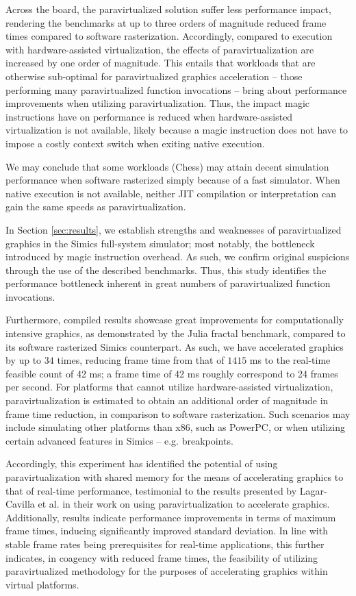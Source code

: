 \documentclass{article}
\begin{document}
Across the board, the paravirtualized solution suffer less performance impact, rendering the benchmarks at up to three orders of magnitude reduced frame times compared to software rasterization.
Accordingly, compared to execution with hardware-assisted virtualization, the effects of paravirtualization are increased by one order of magnitude.
This entails that workloads that are otherwise sub-optimal for paravirtualized graphics acceleration -- those performing many paravirtualized function invocations -- bring about performance improvements when utilizing paravirtualization.
Thus, the impact magic instructions have on performance is reduced when hardware-assisted virtualization is not available, likely because a magic instruction does not have to impose a costly context switch when exiting native execution.

We may conclude that some workloads (Chess) may attain decent simulation performance when software rasterized simply because of a fast simulator.
When native execution is not available, neither JIT compilation or interpretation can gain the same speeds as paravirtualization.

In Section \ref{sec:results}, we establish strengths and weaknesses of paravirtualized graphics in the Simics full-system simulator; most notably, the bottleneck introduced by magic instruction overhead.
As such, we confirm original suspicions through the use of the described benchmarks.
Thus, this study identifies the performance bottleneck inherent in great numbers of paravirtualized function invocations.

Furthermore, compiled results showcase great improvements for computationally intensive graphics, as demonstrated by the Julia fractal benchmark, compared to its software rasterized Simics counterpart.
As such, we have accelerated graphics by up to $34$ times, reducing frame time from that of $1415$ ms to the real-time feasible count of 42 ms; a frame time of 42 ms roughly correspond to 24 frames per second.
For platforms that cannot utilize hardware-assisted virtualization, paravirtualization is estimated to obtain an additional order of magnitude in frame time reduction, in comparison to software rasterization.
Such scenarios may include simulating other platforms than x86, such as PowerPC, or when utilizing certain advanced features in Simics -- e.g. breakpoints.

Accordingly, this experiment has identified the potential of using paravirtualization with shared memory for the means of accelerating graphics to that of real-time performance, testimonial to the results presented by Lagar-Cavilla et al. in their work on using paravirtualization to accelerate graphics.
Additionally, results indicate performance improvements in terms of maximum frame times, inducing significantly improved standard deviation.
In line with stable frame rates being prerequisites for real-time applications, this further indicates, in coagency with reduced frame times, the feasibility of utilizing paravirtualized methodology for the purposes of accelerating graphics within virtual platforms.
\end{document}
